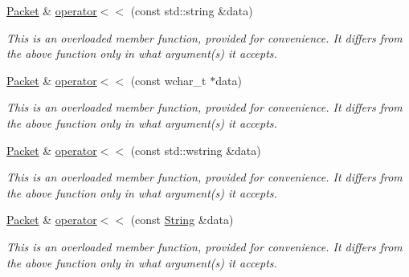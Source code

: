 \begin{DoxyCompactItemize}
\mbox{\hyperlink{classsf_1_1_packet}{Packet}} \& \mbox{\hyperlink{classsf_1_1_packet_a59a21671caaa69da5d47c54b50e1eb54}{operator$<$$<$}} (const std\+::string \&data)
\begin{DoxyCompactList}\small\item\em This is an overloaded member function, provided for convenience. It differs from the above function only in what argument(s) it accepts. \end{DoxyCompactList}\item 
\mbox{\label{classsf_1_1_packet_a6f7c6a9ce795fac342ea937896d98016}} 
\mbox{\hyperlink{classsf_1_1_packet}{Packet}} \& \mbox{\hyperlink{classsf_1_1_packet_a6f7c6a9ce795fac342ea937896d98016}{operator$<$$<$}} (const wchar\+\_\+t $\ast$data)
\begin{DoxyCompactList}\small\item\em This is an overloaded member function, provided for convenience. It differs from the above function only in what argument(s) it accepts. \end{DoxyCompactList}\item 
\mbox{\label{classsf_1_1_packet_a9f3401d038470f629d0c2c6be928a14b}} 
\mbox{\hyperlink{classsf_1_1_packet}{Packet}} \& \mbox{\hyperlink{classsf_1_1_packet_a9f3401d038470f629d0c2c6be928a14b}{operator$<$$<$}} (const std\+::wstring \&data)
\begin{DoxyCompactList}\small\item\em This is an overloaded member function, provided for convenience. It differs from the above function only in what argument(s) it accepts. \end{DoxyCompactList}\item 
\mbox{\label{classsf_1_1_packet_abc17272df082a36b202e10045bd9e220}} 
\mbox{\hyperlink{classsf_1_1_packet}{Packet}} \& \mbox{\hyperlink{classsf_1_1_packet_abc17272df082a36b202e10045bd9e220}{operator$<$$<$}} (const \mbox{\hyperlink{classsf_1_1_string}{String}} \&data)
\begin{DoxyCompactList}\small\item\em This is an overloaded member function, provided for convenience. It differs from the above function only in what argument(s) it accepts. \end{DoxyCompactList}\end{DoxyCompactItemize}
